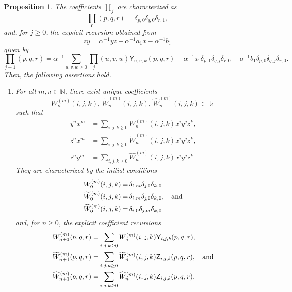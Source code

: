 \documentclass{amsart}
\newtheorem{proposition}[theorem]{Proposition}
\theoremstyle{definition}
\theoremstyle{remark}
\numberwithin{equation}{section}
\begin{document}
\begin{proposition}
The coefficients $\prod_j$ are characterized as 
\[
\prod_0(p,q,r) = \delta_{p,0}\delta_{q,0}\delta_{r,1},
\]
and, for $j\ge 0$, the explicit recursion obtained from 
$$
zy = \alpha^{-1}yz-\alpha^{-1}a_1x-\alpha^{-1}b_1
$$
given by 
{\small{
\begin{equation}\label{Pirec4}
\prod_{j+1}(p,q,r)=\alpha^{-1}\sum_{u,v,w\ge 0}\prod_j(u,v,w)\mathsf Y_{u,v,w}(p,q,r)-\alpha^{-1}a_1\delta_{p,1}\delta_{q,j}\delta_{r,0}-\alpha^{-1}b_1\delta_{p,0}\delta_{q,j}\delta_{r,0}.
\end{equation}
}}
Then, the following assertions hold.
\begin{enumerate}
\item [\rm (1)] For all $m,n\in \mathbb{N}$, there exist unique coefficients
\[
W^{(m)}_{n}(i,j,k),\ \widetilde W^{(m)}_{n}(i,j,k),\ \widehat W^{(m)}_{n}(i,j,k)\in\Bbbk
\]
such that
\begin{align}
y^n x^m&=\sum_{i,j,k\ge 0}W^{(m)}_{n}(i,j,k)x^i y^j z^k,\label{ynxmcase4}\\
z^n x^m&=\sum_{i,j,k\ge 0}\widetilde W^{(m)}_{n}(i,j,k)x^i y^j z^k,\label{znxmcase4}\\
z^n y^m&=\sum_{i,j,k\ge 0}\widehat W^{(m)}_{n}(i,j,k)x^i y^j z^k.\label{znymcase4}
\end{align}
They are characterized by the initial conditions
\begin{align*}
W^{(m)}_{0}(i,j,k) = &\, \delta_{i,m}\delta_{j,0}\delta_{k,0} \\    \widetilde W^{(m)}_{0}(i,j,k) = &\, \delta_{i,m}\delta_{j,0}\delta_{k,0}, \quad {\rm and} \\
\widehat W^{(m)}_{0}(i,j,k) = &\, \delta_{i,0}\delta_{j,m}\delta_{k,0}
\end{align*}
and, for $n\ge 0$, the explicit coefficient recursions
\begin{equation}\label{Wreccase4}
\begin{aligned}
W^{(m)}_{n+1}(p,q,r)&=\sum_{i,j,k\ge 0}W^{(m)}_{n}(i,j,k)\mathsf Y_{i,j,k}(p,q,r),\\
\widetilde W^{(m)}_{n+1}(p,q,r)&=\sum_{i,j,k\ge 0}\widetilde W^{(m)}_{n}(i,j,k)\mathsf Z_{i,j,k}(p,q,r), \quad {\rm and} \\
\widehat W^{(m)}_{n+1}(p,q,r)&=\sum_{i,j,k\ge 0}\widehat W^{(m)}_{n}(i,j,k)\mathsf Z_{i,j,k}(p,q,r).
\end{aligned}
\end{equation}


\end{enumerate}
\end{proposition}
\end{document}

